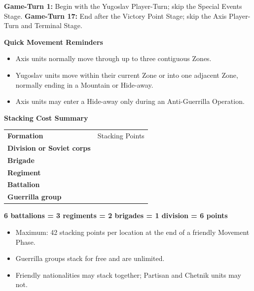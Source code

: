 \documentclass[10pt,letterpaper]{article}
\newcommand{\aidheading}[1]{%
  \par\vspace{4pt}%
  {\sffamily\bfseries\large\color{TitoInk}#1\par}%
  \vspace{1.5pt}{\color{TitoRule}\hrule height 0.5pt}\vspace{4pt}%
}
\begin{document}
\begin{minipage}[t]{0.50\textwidth}
\vspace{5pt}
\colorbox{TitoPale}{%
  \parbox{\dimexpr\linewidth-2\fboxsep\relax}{%
    \footnotesize
    \textbf{Game-Turn 1:} Begin with the Yugoslav Player-Turn; skip the Special
    Events Stage. \quad
    \textbf{Game-Turn 17:} End after the Victory Point Stage; skip the Axis
    Player-Turn and Terminal Stage.}}

\aidheading{Quick Movement Reminders}
\footnotesize
\begin{itemize}[leftmargin=1.2em,itemsep=2pt]
  \item Axis units normally move through up to three contiguous Zones.
  \item Yugoslav units move within their current Zone or into one adjacent
    Zone, normally ending in a Mountain or Hide-away.
  \item Axis units may enter a Hide-away only during an Anti-Guerrilla
    Operation.
\end{itemize}

\aidheading{Stacking Cost Summary}
\footnotesize
{}
\begin{tabularx}{\linewidth}{@{}>{\bfseries}X >{\raggedleft\arraybackslash}p{0.95in}@{}}
  \rowcolor{TitoInk!15}
  Formation & Stacking Points \\
  Division or Soviet corps & 6 \\
  Brigade & 3 \\
  Regiment & 2 \\
  Battalion & 1 \\
  Guerrilla group & 0 \\
\end{tabularx}

\vspace{3pt}
\colorbox{TitoPale}{%
  \parbox{\dimexpr\linewidth-2\fboxsep\relax}{%
    \centering\bfseries
    6 battalions = 3 regiments = 2 brigades = 1 division = 6 points}}

\vspace{2pt}
\begin{itemize}[leftmargin=1.2em,itemsep=1.5pt]
  \item Maximum: 42 stacking points per location at the end of a friendly
    Movement Phase.
  \item Guerrilla groups stack for free and are unlimited.
  \item Friendly nationalities may stack together; Partisan and Chetnik units
    may not.
\end{itemize}
\end{minipage}
\end{document}
